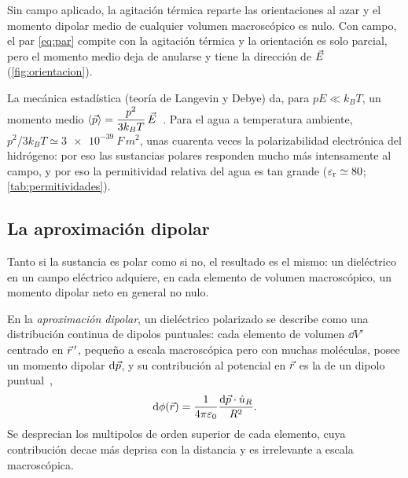 Sin campo aplicado, la agitación térmica reparte las orientaciones al azar y el momento dipolar medio
de cualquier volumen macroscópico es nulo. Con campo, el par \eqref{eq:par} compite con la agitación
térmica y la orientación es solo parcial, pero el momento medio deja de anularse y tiene la dirección de
$\vec E$ (\cref{fig:orientacion}).



\begin{observacion}\label{obs:langevin}
La mecánica estadística (teoría de Langevin y Debye) da, para $pE\ll k_BT$, un momento medio
$\langle\vec p\rangle=\dfrac{p^2}{3k_BT}\,\vec E$~\cite{Purcell,Jackson}. Para el agua a temperatura ambiente,
$p^2/3k_BT\simeq\SI{3e-39}{F\,m^2}$, unas cuarenta veces la polarizabilidad electrónica del hidrógeno: por
eso las sustancias polares responden mucho más intensamente al campo, y por eso la permitividad relativa
del agua es tan grande ($\varepsilon_{\mathrm r}\simeq80$; \cref{tab:permitividades}).
\end{observacion}

\subsection{La aproximación dipolar}\label{sec:aprox-dipolar}

Tanto si la sustancia es polar como si no, el resultado es el mismo: un dieléctrico en un campo eléctrico
adquiere, en cada elemento de volumen macroscópico, un momento dipolar neto en general no nulo.

\begin{definicion}\label{def:aprox-dipolar}
En la \emph{aproximación dipolar}, un dieléctrico polarizado se describe como una distribución continua de
dipolos puntuales: cada elemento de volumen $\dd V'$ centrado en $\vec r\,'$, pequeño a escala macroscópica pero
con muchas moléculas, posee un momento dipolar $\mathop{}\!\mathrm{d}\vec p$, y su contribución al potencial en $\vec r$ es la de un
dipolo puntual~\cite{T2},
\begin{equation}\label{eq:dphi-dipolo}
  \mathop{}\!\mathrm{d}\phi(\vec r)=\frac{1}{4\pi\varepsilon_0}\frac{\mathop{}\!\mathrm{d}\vec p\cdot\hat u_{R}}{R^2}.
\end{equation}
Se desprecian los multipolos de orden superior de cada elemento, cuya contribución decae más deprisa con la
distancia y es irrelevante a escala macroscópica.
\end{definicion}
